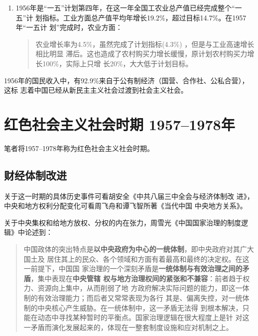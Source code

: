 \begin{enumerate}

\item 1956年是“一五”计划第四年，在这一年全国工农业总产值已经完成整个“一五”计
  划指标。工业方面总产值平均年增长19.2\%，超过目标14.7\%。在1957年“一五计
  划”完成时，农业方面：
  \begin{quotation}
    农业增长率为4.5\%，虽然完成了计划指标(4.3\%) ，但是与工业高速增长相比明显
    滞后。这也造成了农村购买力增长缓慢，原计划农村购买力增长100\%，实际上只增
    长20\%，大大低于计划目标。\cite{shiyiwu}
  \end{quotation}

\end{enumerate}

1956年的国民收入中，有92.9\%来自于公有制经济（国营、合作社、公私合营），这标
志着中国已经从新民主主义社会过渡到社会主义社会。

\section{红色社会主义社会时期 1957--1978年}


笔者将1957--1978年称为红色社会主义社会时期。

\subsection{财经体制改进}

关于这一时期的具体历史事件可看胡安全《中共八届三中全会与经济体制改
进》\cite{DZSY201701010}，中央和地方权利分配变化可看周飞舟和谭飞智所著《当代中国
中央地方关系》\cite{yangdi}。

关于中央集权和给地方放权、分权的内在张力，周雪光《中国国家治理的制度逻辑》中论述到：
\begin{quotation}
  中国政体的突出特点是\textbf{以中央政府为中心的一统体制}，即中央政府对其广大国土及
  居住其上的民众、各个领域和方面有着最高和最终的决定权。在这一前提下，中国国
  家治理的一个深刻矛盾是\textbf{一统体制与有效治理之间的矛盾}，集中表现在\textbf{中央管辖
    权与地方治理权间的紧张和不兼容}：前者趋于权力、资源向上集中，从而削弱了地
  方政府解决实际问题的能力，即这一体制的有效治理能力；而后者又常常表现为各行
  其是、偏离失控，对一统体制的中央核心产生威胁。在一统体制中，这一矛盾无法得
  到根本解决，只能在动态中寻找某种暂时的平衡点。国家治理逻辑在很大程度上是针
  对这一矛盾而演化发展起来的，体现在一整套制度设施和应对机制之上。
\end{quotation}

